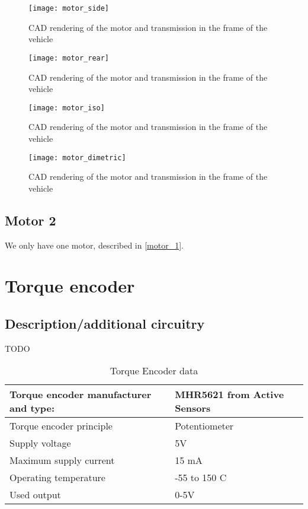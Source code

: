 \documentclass{article}
\begin{document}
\begin{figure}[H]
    \centering
    \texttt{[image: motor\_side]}
    \caption{CAD rendering of the motor and transmission in the frame of the vehicle}
    \label{motor_side}
\end{figure}

\begin{figure}[H]
    \centering
    \texttt{[image: motor\_rear]}
    \caption{CAD rendering of the motor and transmission in the frame of the vehicle}
    \label{motor_rear}
\end{figure}

\begin{figure}[H]
    \centering
    \texttt{[image: motor\_iso]}
    \caption{CAD rendering of the motor and transmission in the frame of the vehicle}
    \label{motor_iso}
\end{figure}

\begin{figure}[H]
    \centering
    \texttt{[image: motor\_dimetric]}
    \caption{CAD rendering of the motor and transmission in the frame of the vehicle}
    \label{motor_dimetric}
\end{figure}

\subsection{Motor 2}\label{motor_2}
We only have one motor, described in \ref{motor_1}.

\section{Torque encoder}\label{torque_encoder}
\subsection{Description/additional circuitry}
TODO

\begin{table}[H]
	\centering
	\begin{tabular}{|l|l|}
	\hline
	Torque encoder manufacturer and type: & MHR5621 from Active Sensors \\ \hline
	Torque encoder principle & Potentiometer \\ \hline
	Supply voltage & 5V \\ \hline
	Maximum supply current & 15 mA \\ \hline
	Operating temperature & -55 to 150 \degree C \\ \hline
	Used output & 0-5V \\ \hline
	\end{tabular}
	\caption{Torque Encoder data}
	\label{encoder}
\end{table}
\end{document}
